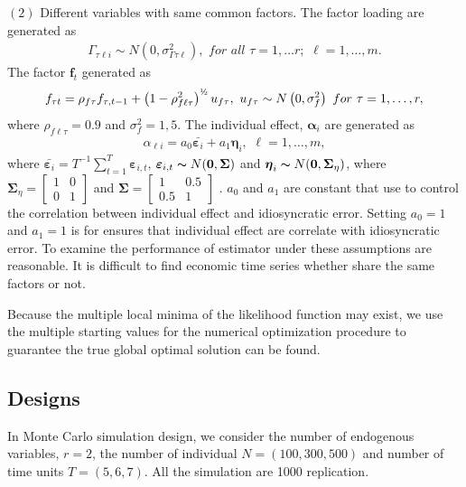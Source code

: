 \documentclass[12pt,a4paper,hyperref]{article}
\begin{document}
$(2)$  Different variables with same common factors. The factor loading are generated as
\begin{align*}
\Gamma_{\tau \ell i}\sim N\left(0,\sigma^{2}_{\Gamma \tau \ell}  \right),  \,\, for \,\, all \,\,\tau=1,\ldots r ;\,\, \ell=1,\ldots, m.
\end{align*}
The factor $\boldsymbol{f}_{t}$ generated as
\begin{align}
f_{ \tau t}=\rho_{f \tau} f_{ \tau, t-1}+\left(1- \rho^{2}_{f \ell \tau} \right)^{\text{\textonehalf}}u_{f \tau},\,\, u_{f \tau}\sim N\left(0, \sigma^{2}_{f} \right) \,\,for \,\, \tau=1,\ldots, r,
\end{align}
where $\rho_{f \ell \tau}=0.9$ and $\sigma^{2}_{f}=1,5$.
The individual effect, $\boldsymbol{\alpha}_{i}$ are generated as
\begin{align}
\alpha_{\ell i}=a_{0}\bar{\boldsymbol{\varepsilon}_{i}}+a_{1}\boldsymbol{\eta}_{i}, \,\, \ell=1,\ldots, m,
\end{align}
where $\bar{\boldsymbol{\varepsilon}_{i}}=T^{-1}\sum^{T}_{t=1}\boldsymbol{\varepsilon}_{i,t}$, $\boldsymbol{\varepsilon}_{i,t} \thicksim N(\boldsymbol{0}, \boldsymbol{\Sigma})$ and $\boldsymbol{\eta}_{i} \thicksim N(\boldsymbol{0}, \boldsymbol{\Sigma}_{\eta})$, where
$\boldsymbol{\Sigma}_{\eta}=
\begin{bmatrix}
1 & 0 \\
0 & 1
\end{bmatrix}$ and $\boldsymbol{\Sigma}=
\begin{bmatrix}
1 & 0.5 \\
0.5 & 1
\end{bmatrix}$
. $a_{0}$ and $a_{1}$ are constant that use to control the correlation between individual effect and idiosyncratic error. Setting $a_{0}=1$ and $a_{1}=1$ is for ensures that individual effect are correlate with idiosyncratic error. To examine the performance of estimator under these assumptions are reasonable. It is difficult to find economic time series whether share the same factors or not.

Because the multiple local minima of the likelihood function may exist, we use the multiple starting values for the numerical optimization procedure to guarantee the true global optimal solution can be found.

\subsection{Designs}
In Monte Carlo simulation design, we consider the number of endogenous variables, $r=2$, the number of individual $N=\left(100, 300, 500 \right)$ and number of time units $T=\left(5, 6, 7 \right)$. All the simulation are 1000 replication.
\end{document}
